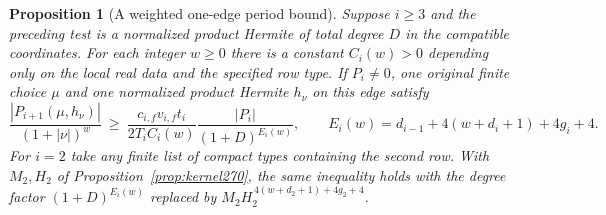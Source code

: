 \documentclass[a4paper,11pt]{article}
\newtheorem{proposition}{Proposition}[section]
\theoremstyle{definition}
\theoremstyle{remark}
\numberwithin{equation}{section}
\begin{document}
\begin{proposition}[A weighted one-edge period bound]\leavevmode
\label{prop:weighted270}
Suppose \(i\ge3\) and the preceding test is a normalized product
Hermite of total degree \(D\) in the compatible coordinates.
For each integer \(w\ge0\) there is a constant \(C_i(w)>0\)
depending only on the local real data and the specified row
type. If \(P_i\ne0\), one original finite choice \(\mu\) and
one normalized product Hermite \(h_\nu\) on this edge satisfy
\[
 \frac{|P_{i+1}(\mu,h_\nu)|}{(1+|\nu|)^w}
 \ \ge\
 \frac{c_{i,f}v_{i,f}t_i}{2T_i C_i(w)}
       \frac{|P_i|}{(1+D)^{E_i(w)}},\qquad
 E_i(w)=d_{i-1}+4(w+d_i+1)+4g_i+4 .
\]
For \(i=2\) take any finite list of compact types containing
the second row. With \(M_2,H_2\) of
Proposition~\ref{prop:kernel270}, the same inequality holds
with the degree factor \((1+D)^{E_i(w)}\) replaced by
\(M_2H_2^{\,4(w+d_2+1)+4g_2+4}\).
\end{proposition}
\end{document}
